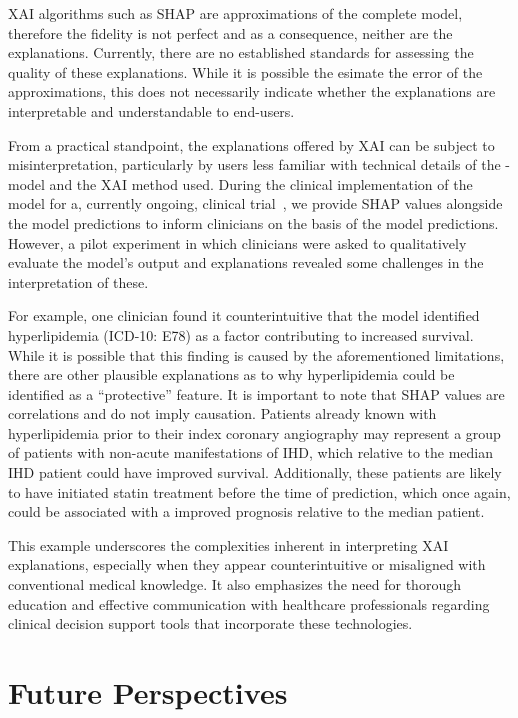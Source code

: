\ac{XAI} algorithms such as \ac{SHAP} are approximations 
of the complete model, therefore the fidelity is not perfect
and as a consequence, neither are the explanations.
Currently, there are no established standards for assessing the quality
of these explanations.
While it is possible the esimate the error of the approximations,
this does not necessarily indicate whether the explanations are interpretable
and understandable to end-users. 

From a practical standpoint,
the explanations offered by \ac{XAI} can be subject to misinterpretation,
particularly by users less familiar with technical details of 
the -model and the \ac{XAI} method used.
During the clinical implementation of the  model for a, 
currently ongoing, clinical trial~\autocite{bundgaardClinical2023}, 
we provide \ac{SHAP} values alongside the model predictions to inform 
clinicians on the basis of the model predictions.
However, a pilot experiment in which clinicians were asked to qualitatively 
evaluate the model's output and explanations revealed some challenges in 
the interpretation of these.

For example, one clinician found it counterintuitive that the model identified
hyperlipidemia (\acs{ICD-10}: E78) as a factor contributing to increased 
survival.
While it is possible that this finding is caused by the aforementioned
limitations, there are other plausible explanations as to why
hyperlipidemia could be identified as a \enquote{protective} feature.
It is important to note that \ac{SHAP} values are correlations and 
do not imply causation.
Patients already known with hyperlipidemia prior to
their index coronary angiography may represent a 
group of patients with non-acute manifestations of \ac{IHD},
which relative to the median \ac{IHD} patient could
have improved survival.
Additionally, these patients are likely to have
initiated statin treatment before the time of prediction,
which once again, could be associated with a improved
prognosis relative to the median patient.

This example underscores the complexities inherent in
interpreting \ac{XAI} explanations, especially when they appear
counterintuitive or misaligned with conventional medical knowledge. 
It also emphasizes the need for thorough education and effective communication
with healthcare professionals regarding clinical decision support tools that
incorporate these technologies.

\section{Future Perspectives}

